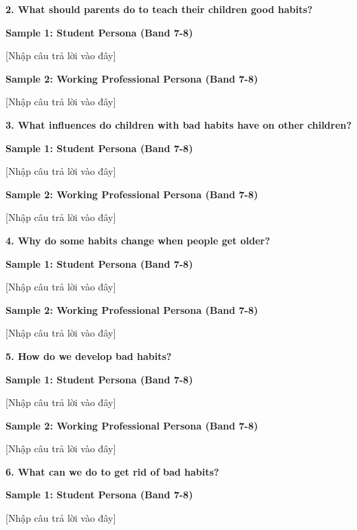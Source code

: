 \separator

\begin{ieltsquestion}
\textbf{2. What should parents do to teach their children good habits?}
\end{ieltsquestion}
\textbf{Sample 1: Student Persona (Band 7-8)}

[Nhập câu trả lời vào đây]

\textbf{Sample 2: Working Professional Persona (Band 7-8)}

[Nhập câu trả lời vào đây]

\separator

\begin{ieltsquestion}
\textbf{3. What influences do children with bad habits have on other children?}
\end{ieltsquestion}
\textbf{Sample 1: Student Persona (Band 7-8)}

[Nhập câu trả lời vào đây]

\textbf{Sample 2: Working Professional Persona (Band 7-8)}

[Nhập câu trả lời vào đây]

\separator

\begin{ieltsquestion}
\textbf{4. Why do some habits change when people get older?}
\end{ieltsquestion}
\textbf{Sample 1: Student Persona (Band 7-8)}

[Nhập câu trả lời vào đây]

\textbf{Sample 2: Working Professional Persona (Band 7-8)}

[Nhập câu trả lời vào đây]

\separator

\begin{ieltsquestion}
\textbf{5. How do we develop bad habits?}
\end{ieltsquestion}
\textbf{Sample 1: Student Persona (Band 7-8)}

[Nhập câu trả lời vào đây]

\textbf{Sample 2: Working Professional Persona (Band 7-8)}

[Nhập câu trả lời vào đây]

\separator

\begin{ieltsquestion}
\textbf{6. What can we do to get rid of bad habits?}
\end{ieltsquestion}
\textbf{Sample 1: Student Persona (Band 7-8)}

[Nhập câu trả lời vào đây]

